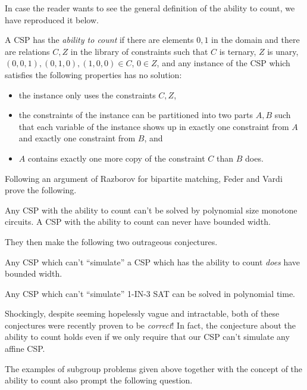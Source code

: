 In case the reader wants to see the general definition of the ability to count, we have reproduced it below.

\begin{defn} A CSP has the \emph{ability to count} if there are elements $0,1$ in the domain and there are relations $C, Z$ in the library of constraints such that $C$ is ternary, $Z$ is unary, $(0,0,1),(0,1,0),(1,0,0) \in C$, $0 \in Z$, and any instance of the CSP which satisfies the following properties has no solution:
\begin{itemize}
\item the instance only uses the constraints $C, Z$,
\item the constraints of the instance can be partitioned into two parts $A, B$ such that each variable of the instance shows up in exactly one constraint from $A$ and exactly one constraint from $B$, and
\item $A$ contains exactly one more copy of the constraint $C$ than $B$ does.
\end{itemize}
\end{defn}

Following an argument of Razborov for bipartite matching, Feder and Vardi prove the following.

\begin{thm} Any CSP with the ability to count can't be solved by polynomial size monotone circuits. A CSP with the ability to count can never have bounded width.
\end{thm}

They then make the following two outrageous conjectures.

\begin{conj} Any CSP which can't ``simulate'' a CSP which has the ability to count \emph{does} have bounded width.
\end{conj}

\begin{conj} Any CSP which can't ``simulate'' 1-IN-3 SAT can be solved in polynomial time.
\end{conj}

Shockingly, despite seeming hopelessly vague and intractable, both of these conjectures were recently proven to be \emph{correct}! In fact, the conjecture about the ability to count holds even if we only require that our CSP can't simulate any affine CSP.

The examples of subgroup problems given above together with the concept of the ability to count also prompt the following question.

